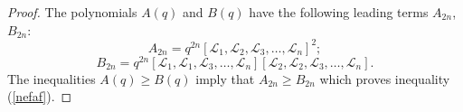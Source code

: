 \documentclass[10pt,a4paper]{amsart}
\begin{document}
\begin{proof}
The polynomials $A(q)$ and $B(q)$ have the following  leading terms  $A_{2n}$, $B_{2n}$:  \begin{equation*}A_{2n}=q^{2n}  [\mathcal L_1, \mathcal L_2, \mathcal L_3,\dots, \mathcal L_n]^2;\end{equation*}
\begin{equation*}B_{2n}=q^{2n} [\mathcal L_1,\mathcal L_1, \mathcal  L_3, \dots,\mathcal L_n] [\mathcal L_2,\mathcal L_2, \mathcal  L_3, \dots, \mathcal  L_n].\end{equation*}  The inequalities $A(q)\geq B(q)$  imply that $A_{2n}\geq B_{2n}$ which proves inequality (\ref{nefaf}).
\end{proof}
\end{document}
